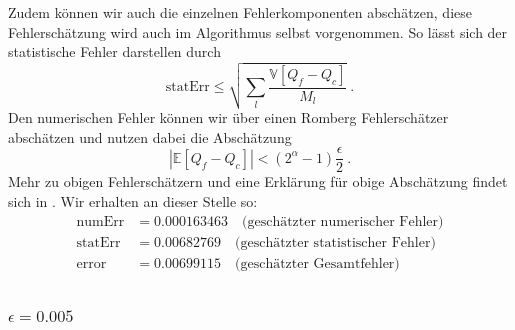 Zudem können wir auch die einzelnen Fehlerkomponenten abschätzen, diese Fehlerschätzung wird auch im Algorithmus selbst vorgenommen. So lässt sich der statistische Fehler darstellen durch \[
\text{statErr} \leq \sqrt{\sum_l   \frac{\mathbb{V}[Q_f-Q_c]}{M_l}} \ . \] 
Den numerischen Fehler können wir über einen Romberg Fehlerschätzer abschätzen und nutzen dabei die Abschätzung \[ \left| \mathbb{E}[Q_f-Q_c] \right| < (2^{\alpha}-1)\frac{\epsilon}{2} \ . \] Mehr zu obigen Fehlerschätzern und eine Erklärung für obige Abschätzung findet sich in \cite{giles_2015}.
Wir erhalten an dieser Stelle so: 
\begin{align*}
\text{numErr}  &=  0.000163463   \quad \text{(geschätzter numerischer Fehler)}\\
\text{statErr} &= 0.00682769  \quad  \text{(geschätzter statistischer Fehler)}\\
\text{error}   &= 0.00699115   \quad  \text{(geschätzter Gesamtfehler)}\\
\end{align*}



\subsubsection{$ \epsilon=0.005 $}

